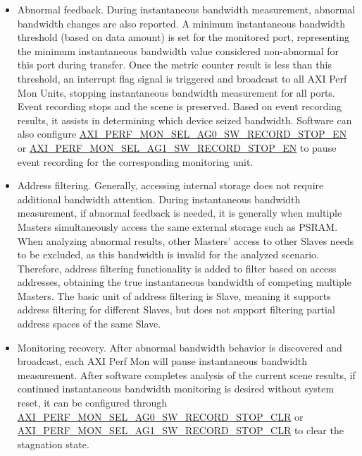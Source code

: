 \documentclass[main\_\_EN.tex]{subfiles}
\begin{document}
\begin{itemize}
    \item Abnormal feedback. During instantaneous bandwidth measurement, abnormal bandwidth changes are also reported. A minimum instantaneous bandwidth threshold (based on data amount) is set for the monitored port, representing the minimum instantaneous bandwidth value considered non-abnormal for this port during transfer. Once the metric counter result is less than this threshold, an interrupt flag signal is triggered and broadcast to all AXI Perf Mon Units, stopping instantaneous bandwidth measurement for all ports. Event recording stops and the scene is preserved. Based on event recording results, it assists in determining which device seized bandwidth. Software can also configure \hyperref[fielddesc:AXIPERFMONSELAG0SWRECORDSTOPEN]{AXI\_PERF\_MON\_SEL\_AG0\_SW\_RECORD\_STOP\_EN} or \hyperref[fielddesc:AXIPERFMONSELAG1SWRECORDSTOPEN]{AXI\_PERF\_MON\_SEL\_AG1\_SW\_RECORD\_STOP\_EN} to pause event recording for the corresponding monitoring unit.
    \item Address filtering. Generally, accessing internal storage does not require additional bandwidth attention. During instantaneous bandwidth measurement, if abnormal feedback is needed, it is generally when multiple Masters simultaneously access the same external storage such as PSRAM. When analyzing abnormal results, other Masters' access to other Slaves needs to be excluded, as this bandwidth is invalid for the analyzed scenario. Therefore, address filtering functionality is added to filter based on access addresses, obtaining the true instantaneous bandwidth of competing multiple Masters. The basic unit of address filtering is Slave, meaning it supports address filtering for different Slaves, but does not support filtering partial address spaces of the same Slave.
    \item Monitoring recovery. After abnormal bandwidth behavior is discovered and broadcast, each AXI Perf Mon will pause instantaneous bandwidth measurement. After software completes analysis of the current scene results, if continued instantaneous bandwidth monitoring is desired without system reset, it can be configured through \hyperref[fielddesc:AXIPERFMONSELAG0SWRECORDSTOPCLR]{AXI\_PERF\_MON\_SEL\_AG0\_SW\_RECORD\_STOP\_CLR} or \hyperref[fielddesc:AXIPERFMONSELAG1SWRECORDSTOPCLR]{AXI\_PERF\_MON\_SEL\_AG1\_SW\_RECORD\_STOP\_CLR} to clear the stagnation state.
\end{itemize}

\end{document}
